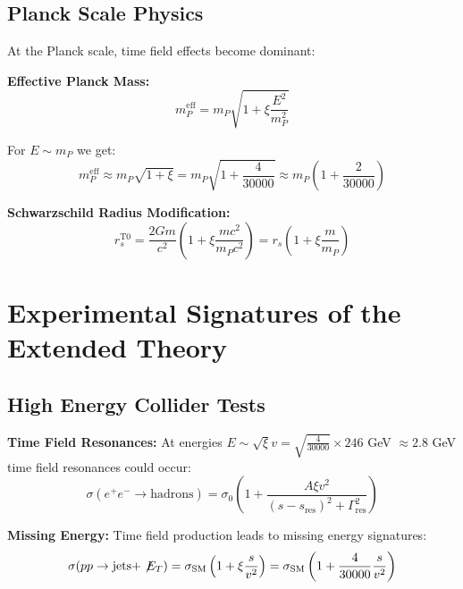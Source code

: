 \documentclass[12pt,a4paper]{report}
\newcommand{\xipar}{\xi}      %
\begin{document}
	\subsection{Planck Scale Physics}\label{subsec:planck_scale_physics}
	
	At the Planck scale, time field effects become dominant:
	
	\textbf{Effective Planck Mass:}
	\begin{equation}
		m_P^{\text{eff}} = m_P \sqrt{1 + \xipar \frac{E^2}{m_P^2}}
	\end{equation}
	
	For $E \sim m_P$ we get:
	\begin{equation}
		m_P^{\text{eff}} \approx m_P \sqrt{1 + \xipar} = m_P \sqrt{1 + \frac{4}{30000}} \approx m_P \left(1 + \frac{2}{30000}\right)
	\end{equation}
	
	\textbf{Schwarzschild Radius Modification:}
	\begin{equation}
		r_s^{\text{T0}} = \frac{2Gm}{c^2} \left(1 + \xipar \frac{mc^2}{m_P c^2}\right) = r_s \left(1 + \xipar \frac{m}{m_P}\right)
	\end{equation}
	
	\section{Experimental Signatures of the Extended Theory}\label{sec:experimental_signatures_extended}
	
	\subsection{High Energy Collider Tests}\label{subsec:high_energy_collider_tests}
	
	\textbf{Time Field Resonances:}
	At energies $E \sim \sqrt{\xipar} v = \sqrt{\frac{4}{30000}} \times 246$ GeV $\approx 2.8$ GeV time field resonances could occur:
	\begin{equation}
		\sigma(e^+ e^- \to \text{hadrons}) = \sigma_0 \left(1 + \frac{A \xipar v^2}{(s - s_{\text{res}})^2 + \Gamma_{\text{res}}^2}\right)
	\end{equation}
	
	\textbf{Missing Energy:}
	Time field production leads to missing energy signatures:
	\begin{equation}
		\sigma(pp \to \text{jets} + \not\!E_T) = \sigma_{\text{SM}} \left(1 + \xipar \frac{s}{v^2}\right) = \sigma_{\text{SM}} \left(1 + \frac{4}{30000} \frac{s}{v^2}\right)
	\end{equation}
	
\end{document}

